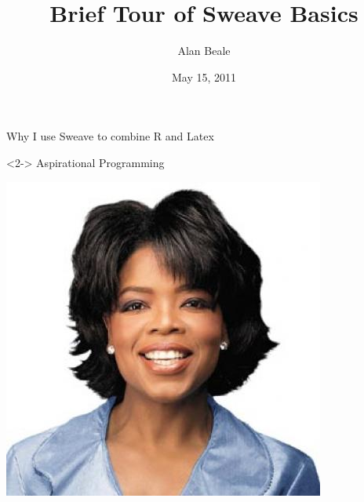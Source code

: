 \documentclass{beamer}
\title[Sweave Basics]{ Brief Tour of Sweave Basics}
\author[A. Beale ]{Alan Beale}
\date[May 2011]{May 15, 2011}
\begin{document}
\graphicspath{{images//}}

\begin{frame} [plain]
  \titlepage
\end{frame}

\begin{frame}{Why I use Sweave to combine R and Latex}
 \begin{block}<2->
   {Aspirational Programming}
\end{block}

\begin{center}
\includegraphics[scale=.4]{thumb-OprahWinfrey}
\end{center}
\end{frame}
\end{document}
